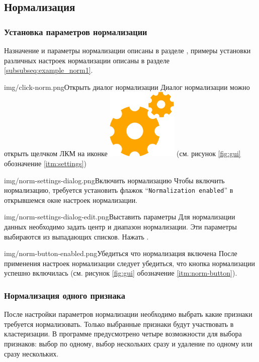 \documentclass[12pt,tikz]{instruction}
\begin{document}
\subsection{Нормализация}
\label{sec:norm}
\subsubsection{Установка параметров нормализации}

Назначение и параметры нормализации описаны в разделе , примеры установки различных настроек нормализации описаны в разделе \ref{subsubseq:example_norm1}.
\begin{steps}
	\begin{ist}{img/click-norm.png}{Открыть диалог нормализации}
		Диалог нормализации можно открыть щелчком ЛКМ на иконке \includegraphics[scale=0.1]{img/settings.png} (см. рисунок \ref{fig:gui} обозначение \ref{itm:settings})
	\end{ist}
	\begin{ist}{img/norm-settings-dialog.png}{Включить нормализацию}
		Чтобы включить нормализацию, требуется установить флажок ``\texttt{Normalization enabled}'' в открывшемся окне настроек нормализации.
	\end{ist}
	\begin{ist}{img/norm-settings-dialog-edit.png}{Выставить параметры}
		Для нормализации данных необходимо задать центр и диапазон нормализации. Эти параметры выбираются из выпадающих списков. Нажать .
	\end{ist}
	\begin{ist}{img/norm-button-enabled.png}{Убедиться что нормализация включена}
		После применения настроек нормализации следует убедиться, что кнопка нормализации успешно включилась (см. рисунок \ref{fig:gui} обозначение \ref{itm:norm-button}).	
	\end{ist}	
\end{steps}

\newpage
\subsubsection{Нормализация одного признака}
\label{subsubsec:onenorm}
После настройки параметров нормализации необходимо выбрать какие признаки требуется нормализовать. Только выбранные признаки будут участвовать в кластеризации. В программе предусмотрено четыре возможности для выбора признаков: выбор по одному, выбор нескольких сразу и удаление по одному или сразу нескольких. 
\end{document}
